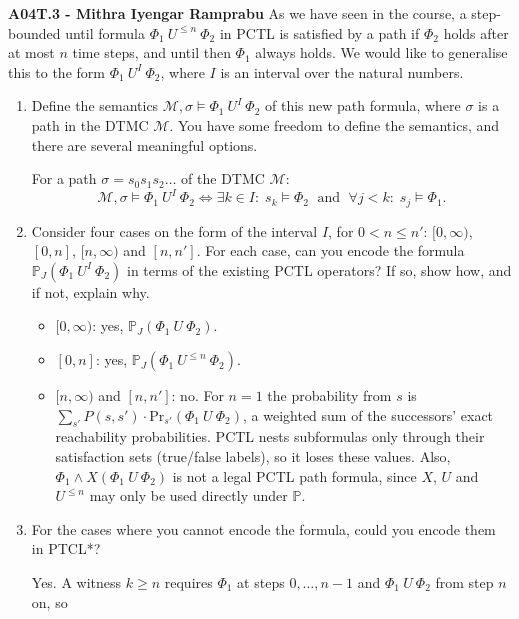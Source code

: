 \documentclass[12pt,a4paper]{article}
\begin{document}
\begin{description}
\item{\bf A04T.3 - Mithra Iyengar Ramprabu} As we have seen in the course, a step-bounded until formula $\Phi_1\ U^{\le n}\ \Phi_2$ in PCTL is satisfied by a path if
$\Phi_2$ holds after at most $n$ time steps, and until then $\Phi_1$ always holds. We would like to generalise this to the
form $\Phi_1\ U^I\ \Phi_2$, where $I$ is an interval over the natural numbers.
\begin{enumerate}[label=\alph*)]
\item Define the semantics $\mathcal{M}, \sigma \models \Phi_1\ U^I\ \Phi_2$ of this new path formula, where $\sigma$ is a path in the DTMC $\mathcal{M}$. You have some freedom to define the semantics, and there are several meaningful options. 
%
\ifwithanswers
\color{blue}
\par
For a path $\sigma = s_0 s_1 s_2 \dots$ of the DTMC $\mathcal{M}$:
\[
\mathcal{M},\sigma \models \Phi_1\ U^{I}\ \Phi_2
\iff
\exists k \in I:\; s_k \models \Phi_2 \;\text{ and }\; \forall j < k:\; s_j \models \Phi_1 .
\]
\color{black}
\fi
%
\item Consider four cases on the form of the interval $I$, for $0 < n \le n'$: $[0,\infty)$, $[0,n]$, $[n,\infty)$ and $[n,n']$. For each case,
can you encode the formula $\mathbb{P}_J(\Phi_1\ U^I\ \Phi_2)$ in terms of the existing PCTL operators? If so, show how, and if not, explain why.
%
\ifwithanswers
\color{blue}
\par
\begin{itemize}
  \item $[0,\infty)$: yes, $\mathbb{P}_J(\Phi_1\ U\ \Phi_2)$.
  \item $[0,n]$: yes, $\mathbb{P}_J(\Phi_1\ U^{\le n}\ \Phi_2)$.
  \item $[n,\infty)$ and $[n,n']$: no. For $n=1$ the probability from $s$ is
        $\sum_{s'} P(s,s') \cdot \mathrm{Pr}_{s'}(\Phi_1\ U\ \Phi_2)$, a weighted sum of
        the successors' exact reachability probabilities. PCTL nests subformulas only
        through their satisfaction sets (true/false labels), so it loses these values.
        Also, $\Phi_1 \wedge X(\Phi_1\ U\ \Phi_2)$ is not a legal PCTL path formula,
        since $X$, $U$ and $U^{\le n}$ may only be used directly under $\mathbb{P}$.
\end{itemize}
\color{black}
\fi
%
\item For the cases where you cannot encode the formula, could you encode them in PTCL*?
%
\ifwithanswers
\color{blue}
\par
Yes. A witness $k \ge n$ requires $\Phi_1$ at steps $0,\dots,n-1$ and $\Phi_1\ U\ \Phi_2$ from step $n$ on, so

\end{enumerate}
\end{description}
\end{document}
